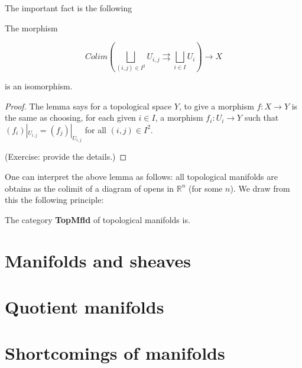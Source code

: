 \documentclass[../main.tex]{subfiles}
\begin{document}
The important fact is the following

\begin{lem}

The morphism

\[
Colim\left(\bigsqcup_{(i, j) \in I^2} U_{i, j} \rightrightarrows \bigsqcup_{i \in I} U_i\right) \to X
\]

is an isomorphism.
\end{lem}

\begin{proof}
The lemma says for a topological space $Y$, to give a morphism $f: X \to Y$ is the same as choosing, for each given $i \in I$, a morphism $f_i: U_i \to Y$ such that $(f_i)|_{U_{i, j}} = (f_j)|_{U_{i, j}}$ for all $(i, j) \in I^2$.

(Exercise: provide the details.)
\end{proof}

One can interpret the above lemma as follows: all topological manifolds are obtains as the colimit of a diagram of opens in $\mathbb R^n$ (for some $n$). We draw from this the following principle:

\begin{prcp*}
The category \textbf{TopMfld} of topological manifolds is.
\end{prcp*}
\section{Manifolds and sheaves}

\section{Quotient manifolds}

\section{Shortcomings of manifolds}
\end{document}
